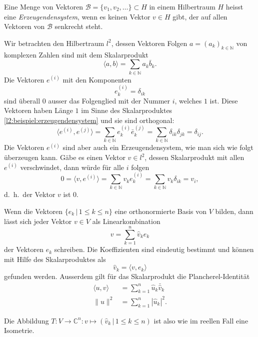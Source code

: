 \begin{definition}
Eine Menge von Vektoren $\mathcal{B} = \{v_1,v_2,\dots\}\subset H$ in einem
Hilbertraum $H$ heisst eine {\em Erzeugendensystem}, wenn es keinen Vektor
$v\in H$ gibt, der auf allen Vektoren von $\mathcal{B}$ senkrecht steht.
\end{definition}

\begin{beispiel}
Wir betrachten den Hilbertraum $l^2$, dessen Vektoren Folgen
$a=(a_k)_{k\in\mathbb N}$ von komplexen Zahlen sind mit dem Skalarprodukt
\begin{equation}
\langle a,b\rangle = \sum_{k\in\mathbb N} a_k\bar{b}_k.
\label{l2:beispiel:erzeugendensystem}
\end{equation}
Die Vektoren $e^{(i)}$ mit den Komponenten
\[
e^{(i)}_k = \delta_{ik}
\]
sind überall $0$ ausser das Folgenglied mit der Nummer $i$, welches $1$
ist. 
Diese Vektoren haben Länge $1$ im Sinne des Skalarproduktes
\eqref{l2:beispiel:erzeugendensystem} und sie sind orthogonal:
\[
\langle e^{(i)}, e^{(j)}\rangle
=
\sum_{k\in\mathbb N} e^{(i)}_k\bar{e}^{(j)}_k
=
\sum_{k\in\mathbb N} \delta_{ik}\delta_{jk}
=
\delta_{ij}.
\]
Die Vektoren $e^{(i)}$ sind aber auch ein Erzeugendensystem, wie man sich
wie folgt überzeugen kann.
Gäbe es einen Vektor $v\in l^2$, dessen Skalarprodukt mit allen $e^{(i)}$
verschwindet, dann würde für alle $i$ folgen
\[
0
=
\langle v,e^{(i)}\rangle
=
\sum_{k\in\mathbb N} v_ke^{(i)}_k
=
\sum_{k\in\mathbb N} v_k\delta_{ik}
=
v_i,
\]
d.~h.~der Vektor $v$ ist $0$.
\end{beispiel}

\begin{satz}
Wenn die Vektoren $\{e_k\,|\, 1\le k\le n\}$ eine orthonormierte Basis
von $V$ bilden, dann lässt sich jeder Vektor $v\in V$ als Linearkombination
\[
v
=
\sum_{k=1}^n \hat{v}_k e_k
\]
der Vektoren $e_k$ schreiben.
Die Koeffizienten sind eindeutig bestimmt und können mit Hilfe des
Skalarproduktes als
\[
\hat{v}_k = \langle v,e_k\rangle
\]
gefunden werden.
Ausserdem gilt für das Skalarprodukt die Plancherel-Identität
\begin{align*}
\langle u,v\rangle &= \sum_{k=1}^n \hat{u}_k\bar{\hat{v}}_k
\\
\| u \|^2 &= \sum_{k=1}^n |\hat{u}_k|^2.
\end{align*}
\end{satz}

Die Abbildung $T\colon V\to \mathbb C^n: v\mapsto (\hat{v}_k\,|\,1\le k\le n)$
ist also wie im reellen Fall eine Isometrie.


